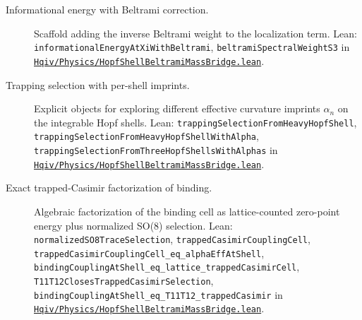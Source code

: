 \documentclass[11pt]{article}
\newcommand{\leanrepo}{https://github.com/HQIV/hqiv-lean/blob/main}
\newcommand{\leanfile}[1]{\href{\leanrepo/#1}{\nolinkurl{#1}}}
\newcommand{\leanid}[1]{\nolinkurl{#1}}
\begin{document}
\begin{description}
\item[\label{lean:informational-energy-beltrami}Informational energy with Beltrami correction.]
  Scaffold adding the inverse Beltrami weight to the localization term.
  Lean: \leanid{informationalEnergyAtXiWithBeltrami},
  \leanid{beltramiSpectralWeightS3}
  in \leanfile{Hqiv/Physics/HopfShellBeltramiMassBridge.lean}.

\item[\label{lean:trapping-selection}Trapping selection with per-shell imprints.]
  Explicit objects for exploring different effective curvature imprints
  $\alpha_n$ on the integrable Hopf shells.
  Lean: \leanid{trappingSelectionFromHeavyHopfShell},
  \leanid{trappingSelectionFromHeavyHopfShellWithAlpha},
  \leanid{trappingSelectionFromThreeHopfShellsWithAlphas}
  in \leanfile{Hqiv/Physics/HopfShellBeltramiMassBridge.lean}.

\item[\label{lean:trapped-casimir-factorization}Exact trapped-Casimir factorization of binding.]
  Algebraic factorization of the binding cell as lattice-counted
  zero-point energy plus normalized SO(8) selection.
  Lean: \leanid{normalizedSO8TraceSelection},
  \leanid{trappedCasimirCouplingCell},
  \leanid{trappedCasimirCouplingCell_eq_alphaEffAtShell},
  \leanid{bindingCouplingAtShell_eq_lattice_trappedCasimirCell},
  \leanid{T11T12ClosesTrappedCasimirSelection},
  \leanid{bindingCouplingAtShell_eq_T11T12_trappedCasimir}
  in \leanfile{Hqiv/Physics/HopfShellBeltramiMassBridge.lean}.

\end{description}



\end{document}
